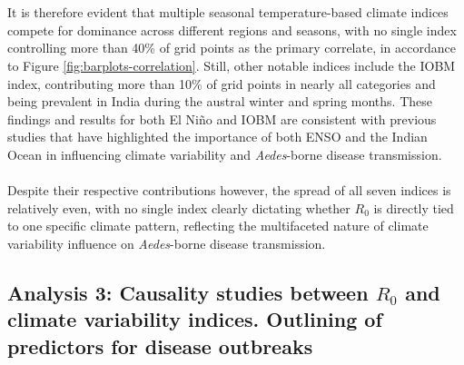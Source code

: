 \documentclass[10pt,twocolumn]{wlscirep}
\begin{document}
\\
\\
It is therefore evident that multiple seasonal temperature-based climate indices compete for dominance across different regions and seasons, with no single index controlling more than 40\% of grid points as the primary correlate, in accordance to Figure \ref{fig:barplots-correlation}. Still, other notable indices include the IOBM index, contributing more than 10\% of grid points in nearly all categories and being prevalent in India during the austral winter and spring months. These findings and results for both El Niño and IOBM are consistent with previous studies that have highlighted the importance of both ENSO and the Indian Ocean in influencing climate variability and \textit{Aedes}-borne disease transmission\cite{chen_2024,kurnianingsih_2020, banu_2015}.
\\
\\
Despite their respective contributions however, the spread of all seven indices is relatively even, with no single index clearly dictating whether $R_0$ is directly tied to one specific climate pattern, reflecting the multifaceted nature of climate variability influence on \textit{Aedes}-borne disease transmission.

\subsection{Analysis 3: Causality studies between $R_0$ and climate variability indices. Outlining of predictors for disease outbreaks} \label{sec-results-3}
\end{document}
